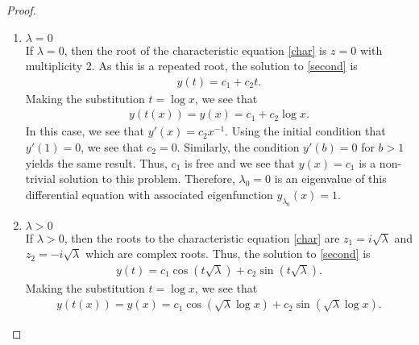 \documentclass[12pt]{article}
\theoremstyle{definition}
\newenvironment{case}{%
  \let\olditem\item%
  \renewcommand\item[1][]{\olditem \textbf{##1} \\}%
  \begin{enumerate}[label=\textbf{Case \arabic*:},itemindent=*,leftmargin=0em]}{\end{enumerate}%
}
\begin{document}
\begin{proof}
\begin{case}
      The initial condition $y'(b) = 0$ for $b > 1$ together with the fact that
      $c_1 = c_2$ shows that
      \begin{align*}
        y'(b) &= c_1\sqrt{-\lambda} b^{\sqrt{-\lambda} - 1} - c_2\sqrt{-\lambda} b^{-\sqrt{-\lambda} - 1} \\
        &= c_1\sqrt{-\lambda} \left(b^{\sqrt{-\lambda} - 1} - b^{-\sqrt{-\lambda} - 1}\right) = 0
      \end{align*}
      showing that since  $\lambda < 0$ we must have that $c_1 = 0$ since $\sqrt{-\lambda}\neq 0$
      and $b^{\sqrt{-\lambda} - 1} \neq b^{-\sqrt{-\lambda} - 1}$. Therefore, for $\lambda < 0$,
      the only solution to the differential equation is the trivial solution and
      in this case there are no eigenvalues of this equation.
    \item[$\lambda = 0$]
      If $\lambda = 0$, then the root of the characteristic equation \eqref{char}
      is $z = 0$ with multiplicity 2. As this is a repeated root, the solution to
      \eqref{second} is
      \begin{align*}
        y(t) = c_1 + c_2 t.
      \end{align*}
      Making the substitution $t = \log x$, we see that
      \begin{align*}
        y(t(x)) = y(x) = c_1 + c_2 \log x.
      \end{align*}
      In this case, we see that $y'(x) = c_2x^{-1}$. Using the initial condition
      that $y'(1) = 0$, we see that $c_2 = 0$. Similarly, the condition $y'(b) = 0$ for $b > 1$
      yields the same result. Thus, $c_1$ is free
      and we see that $y(x) = c_1$ is a non-trivial solution to this problem. Therefore,
      $\lambda_0 = 0$ is an eigenvalue of this differential equation with associated
      eigenfunction $y_{\lambda_0}(x) = 1$.
    \item[$\lambda > 0$]
      If $\lambda > 0$, then the roots to the characteristic equation \eqref{char}
      are $z_1 = i \sqrt{\lambda}$ and $z_2 = -i \sqrt{\lambda}$ which are complex roots.
      Thus, the solution to \eqref{second} is
      \begin{align*}
        y(t) = c_1\cos\left(t\sqrt{\lambda}\right) + c_2\sin\left(t\sqrt{\lambda}\right).
      \end{align*}
      Making the substitution $t = \log x$, we see that
      \begin{align*}
        y(t(x)) = y(x) = c_1\cos\left(\sqrt{\lambda}\log x\right) + c_2\sin\left(\sqrt{\lambda}\log x\right).

\end{align*}
\end{case}
\end{proof}
\end{document}
